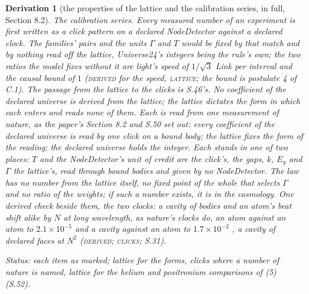 \documentclass[pdflatex,sn-mathphys-num]{sn-jnl}
\newcommand{\claimmark}[1]{\textup{\textsc{#1}}}
\newcommand{\fence}[1]{\textup{\textsc{#1}}}
\theoremstyle{thmstyleone}
\newtheorem{derivation}{Derivation}
\begin{document}
\begin{derivation}[the properties of the lattice and the calibration series, in full, Section 8.2]
\emph{The calibration series.} Every measured number of an experiment is first written as a click pattern on a declared NodeDetector against a declared clock. The families' pairs and the units $\Gamma$ and $T$ would be fixed by that match and by nothing read off the lattice, Universe24's integers being the rule's own; the two ratios the model fixes without it are light's speed of $1 / \sqrt 3$ Link per interval and the causal bound of $1$ (\claimmark{derived} for the speed, \fence{lattice}; the bound is postulate 4 of C.1). The passage from the lattice to the clicks is S.46's. No coefficient of the declared universe is derived from the lattice; the lattice dictates the form in which each enters and reads none of them. Each is read from one measurement of nature, as the paper's Section 8.2 and S.50 set out: every coefficient of the declared universe is read by one click on a bound body; the lattice fixes the form of the reading; the declared universe holds the integer. Each stands in one of two places: $T$ and the NodeDetector's unit of credit are the click's, the gaps, $k$, $E_g$ and $\Gamma$ the lattice's, read through bound bodies and given by no NodeDetector. The law has no number from the lattice itself, no fixed point of the whole that selects $\Gamma$ and no ratio of the weights; if such a number exists, it is in the cosmology. One derived check beside them, the two clocks: a cavity of bodies and an atom's beat shift alike by $N$ at long wavelength, as nature's clocks do, an atom against an atom to $2.1 \times 10^{-5}$ \cite{bauch} and a cavity against an atom to $1.7 \times 10^{-2}$ \cite{turneaure}, a cavity of declared faces at $N^2$ (\claimmark{derived}; \fence{clicks}; S.31).

\emph{Status:} each item as marked; lattice for the forms, clicks where a number of nature is named, lattice for the helium and positronium comparisons of (5) (S.52).
\end{derivation}
\end{document}
